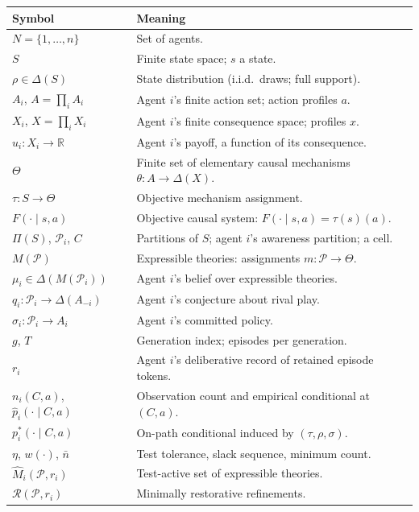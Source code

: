 \documentclass[11pt]{article}
\begin{document}
\begin{center}
\renewcommand{\arraystretch}{1.15}
\begin{tabularx}{\textwidth}{@{}>{\raggedright\arraybackslash}p{}X@{}}
\toprule
\textbf{Symbol} & \textbf{Meaning} \\
\midrule
$N=\{1,\dots,n\}$ & Set of agents. \\
$S$ & Finite state space; $s$ a state. \\
$\rho\in\Delta(S)$ & State distribution (i.i.d.\ draws; full support). \\
$A_i$, $A=\prod_iA_i$ & Agent $i$'s finite action set; action profiles $a$. \\
$X_i$, $X=\prod_iX_i$ & Agent $i$'s finite consequence space; profiles $x$. \\
$u_i:X_i\to\mathbb R$ & Agent $i$'s payoff, a function of its consequence. \\
$\Theta$ & Finite set of elementary causal mechanisms $\theta:A\to\Delta(X)$. \\
$\tau:S\to\Theta$ & Objective mechanism assignment. \\
$F(\cdot\mid s,a)$ & Objective causal system: $F(\cdot\mid s,a)=\tau(s)(a)$. \\
$\Pi(S)$, $\mathcal P_i$, $C$ & Partitions of $S$; agent $i$'s awareness partition; a cell. \\
$M(\mathcal P)$ & Expressible theories: assignments $m:\mathcal P\to\Theta$. \\
$\mu_i\in\Delta(M(\mathcal P_i))$ & Agent $i$'s belief over expressible theories. \\
$q_i:\mathcal P_i\to\Delta(A_{-i})$ & Agent $i$'s conjecture about rival play. \\
$\sigma_i:\mathcal P_i\to A_i$ & Agent $i$'s committed policy. \\
$g$, $T$ & Generation index; episodes per generation. \\
$r_i$ & Agent $i$'s deliberative record of retained episode tokens. \\
$n_i(C,a)$, $\hat p_i(\cdot\mid C,a)$ & Observation count and empirical conditional at $(C,a)$. \\
$p_i^{*}(\cdot\mid C,a)$ & On-path conditional induced by $(\tau,\rho,\sigma)$. \\
$\eta$, $w(\cdot)$, $\bar n$ & Test tolerance, slack sequence, minimum count. \\
$\widehat M_i(\mathcal P,r_i)$ & Test-active set of expressible theories. \\
$\mathcal R(\mathcal P,r_i)$ & Minimally restorative refinements. \\

\end{tabularx}
\end{center}
\end{document}
